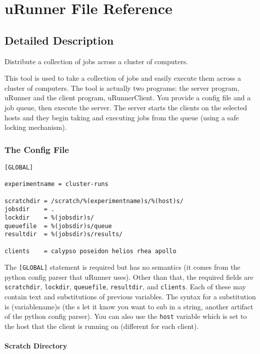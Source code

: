 \section{u\-Runner File Reference}
\label{uRunner}


\subsection{Detailed Description}
Distribute a collection of jobs across a cluster of computers. 

This tool is used to take a collection of jobs and easily execute them across a cluster of computers. The tool is actually two programs: the server program, u\-Runner and the client program, u\-Runner\-Client. You provide a config file and a job queue, then execute the server. The server starts the clients on the selected hosts and they begin taking and executing jobs from the queue (using a safe locking mechanism).

\subsubsection*{The Config File}



\footnotesize\begin{verbatim}
[GLOBAL]

experimentname = cluster-runs

scratchdir = /scratch/%(experimentname)s/%(host)s/
jobsdir    = . 
lockdir    = %(jobsdir)s/
queuefile  = %(jobsdir)s/queue
resultdir  = %(jobsdir)s/results/

clients    = calypso poseidon helios rhea apollo
\end{verbatim}\normalsize


The {\tt [GLOBAL]} statement is required but has no semantics (it comes from the python config parser that u\-Runner uses). Other than that, the required fields are {\tt scratchdir}, {\tt lockdir}, {\tt queuefile}, {\tt resultdir}, and {\tt clients}. Each of these may contain text and substitutions of previous variables. The syntax for a substitution is (variablename)s (the s let it know you want to sub in a string, another artifact of the python config parser). You can also use the {\tt host} variable which is set to the host that the client is running on (different for each client).

\paragraph*{Scratch Directory}

